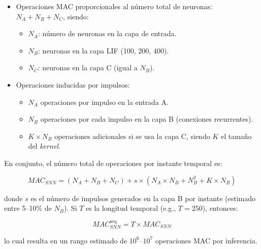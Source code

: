 \begin{itemize}
    \item Operaciones MAC proporcionales al número total de neuronas: $N_A + N_B + N_C$, siendo:
    \begin{itemize}
        \item $N_A$: número de neuronas en la capa de entrada.
        \item $N_B$: neuronas en la capa LIF (100, 200, 400).
        \item $N_C$: neuronas en la capa C (igual a $N_B$).
    \end{itemize}
    
    \item Operaciones inducidas por impulsos:
    \begin{itemize}
        \item $N_A$ operaciones por impulso en la entrada A.
        \item $N_B$ operaciones por cada impulso en la capa B (conexiones recurrentes).
        \item $K \times N_B$ operaciones adicionales si se usa la capa C, siendo $K$ el tamaño del \textit{kernel}.
    \end{itemize}
\end{itemize}

En conjunto, el número total de operaciones por instante temporal es:

\begin{equation}
    MAC_{SNN} = (N_A + N_B + N_C) + s \times (N_A \times N_B + N_B^2 + K \times N_B)
\end{equation}

donde $s$ es el número de impulsos generados en la capa B por instante (estimado entre 5--10\% de $N_B$). Si $T$ es la longitud temporal (e.g., $T = 250$), entonces:

\begin{equation}
    MAC^{\text{seq}}_{SNN} = T \times MAC_{SNN}
\end{equation}

lo cual resulta en un rango estimado de $10^6$--$10^7$ operaciones MAC por inferencia.